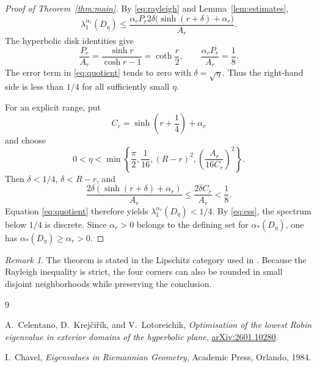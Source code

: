 \documentclass[11pt]{article}
\theoremstyle{remark}
\newtheorem{remark}[theorem]{Remark}
\begin{document}
\begin{proof}[Proof of Theorem~\ref{thm:main}]
By \eqref{eq:rayleigh} and Lemma~\ref{lem:estimates},
\begin{equation}\label{eq:quotient}
 \lambda_1^{\alpha_r}(D_\eta)
 \le
 \frac{\alpha_rP_r
2\delta\bigl(\sinh(r+\delta)+\alpha_r\bigr)}{A_r}.
\end{equation}
The hyperbolic disk identities give
\[
 \frac{P_r}{A_r}
 =\frac{\sinh r}{\cosh r-1}
 =\coth\frac r2,
 \qquad
 \frac{\alpha_rP_r}{A_r}=\frac18.
\]
The error term in \eqref{eq:quotient} tends to zero with
$\delta=\sqrt\eta$.  Thus the right-hand side is less than $1/4$ for all
sufficiently small $\eta$.

For an explicit range, put
\[
 C_r=\sinh\left(r+\frac14\right)+\alpha_r
\]
and choose
\[
 0<\eta<
 \min\left\{
 \frac\pi2,\frac1{16},(R-r)^2,
 \left(\frac{A_r}{16C_r}\right)^2
 \right\}.
\]
Then $\delta<1/4$, $\delta<R-r$, and
\[
 \frac{2\delta(\sinh(r+\delta)+\alpha_r)}{A_r}
 \le\frac{2\delta C_r}{A_r}<\frac18.
\]
Equation \eqref{eq:quotient} therefore yields
$\lambda_1^{\alpha_r}(D_\eta)<1/4$.  By \eqref{eq:ess}, the spectrum below
$1/4$ is discrete.  Since $\alpha_r>0$ belongs to the defining set for
$\alpha_*(D_\eta)$, one has
$\alpha_*(D_\eta)\ge\alpha_r>0$.
\end{proof}

\begin{remark}
The theorem is stated in the Lipschitz category used in \cite{CKL}.  Because
the Rayleigh inequality is strict, the four corners can also be rounded in
small disjoint neighborhoods while preserving the conclusion.
\end{remark}

\begin{thebibliography}{9}

A.~Celentano, D.~Krej\v{c}i\v{r}\'{i}k, and V.~Lotoreichik,
\emph{Optimisation of the lowest Robin eigenvalue in exterior domains of the
hyperbolic plane},
\href{https://arxiv.org/abs/2601.10280}{arXiv:2601.10280}.

I.~Chavel,
\emph{Eigenvalues in Riemannian Geometry},
Academic Press, Orlando, 1984.

\end{thebibliography}
\end{document}
